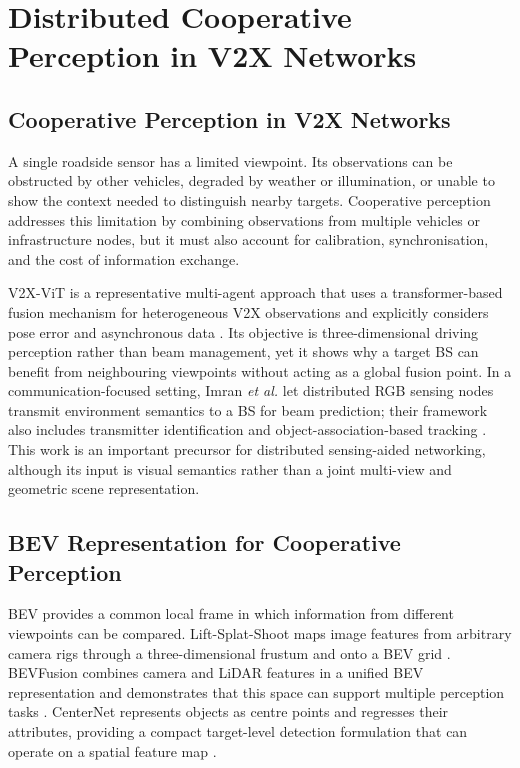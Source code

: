 \section{Distributed Cooperative Perception in V2X Networks}
\label{sec:background-cooperative-perception}

\subsection{Cooperative Perception in V2X Networks}
\label{subsec:background-cooperative-perception}

A single roadside sensor has a limited viewpoint.  Its observations can be
obstructed by other vehicles, degraded by weather or illumination, or unable to
show the context needed to distinguish nearby targets.  Cooperative perception
addresses this limitation by combining observations from multiple vehicles or
infrastructure nodes, but it must also account for calibration, synchronisation,
and the cost of information exchange.

V2X-ViT is a representative multi-agent approach that uses a transformer-based
fusion mechanism for heterogeneous V2X observations and explicitly considers
pose error and asynchronous data \cite{xu2022v2xvitvehicletoeverythingcooperativeperception}.
Its objective is three-dimensional driving perception rather than beam
management, yet it shows why a target BS can benefit from neighbouring
viewpoints without acting as a global fusion point.  In a communication-focused
setting, Imran \emph{et al.} let distributed RGB sensing nodes transmit
environment semantics to a BS for beam prediction; their framework also
includes transmitter identification and object-association-based tracking
\cite{imran2024environmentsemanticcommunicationenabling}.  This work is an
important precursor for distributed sensing-aided networking, although its
input is visual semantics rather than a joint multi-view and geometric scene
representation.

\subsection{BEV Representation for Cooperative Perception}
\label{subsec:background-bev-representation}

BEV provides a common local frame in which information from different
viewpoints can be compared.  Lift-Splat-Shoot maps image features from arbitrary
camera rigs through a three-dimensional frustum and onto a BEV grid
\cite{philion2020liftsplatshootencoding}.  BEVFusion combines camera and LiDAR
features in a unified BEV representation and demonstrates that this space can
support multiple perception tasks \cite{liu2024bevfusionmultitaskmultisensorfusion}.
CenterNet represents objects as centre points and regresses their attributes,
providing a compact target-level detection formulation that can operate on a
spatial feature map \cite{zhou2019objectspoints}.

